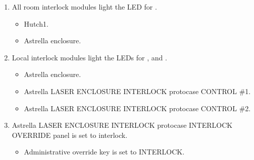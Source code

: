 \documentclass[letterpaper,10pt,english]{sphinxmanual}
\begin{document}
\begin{enumerate}
\begin{itemize}
\item {} 
\sphinxAtStartPar
Astrella enclosure outside west wall.

\item {} 
\sphinxAtStartPar
Astrella enclosure inside south wall.

\item {} 
\sphinxAtStartPar
Astrella enclosure inside west wall.

\item {} 
\sphinxAtStartPar
Astrella enclosure inside east wall.

\item {} 
\sphinxAtStartPar
Hutch\sphinxhyphen{}1 experimental chamber.

\end{itemize}

\item {} 
\sphinxAtStartPar
All room interlock modules light the LED for .
\begin{itemize}
\item {} 
\sphinxAtStartPar
Hutch\sphinxhyphen{}1.

\item {} 
\sphinxAtStartPar
Astrella enclosure.

\end{itemize}

\item {} 
\sphinxAtStartPar
Local interlock modules light the LEDs for , and .
\begin{itemize}
\item {} 
\sphinxAtStartPar
Astrella enclosure.

\item {} 
\sphinxAtStartPar
Astrella LASER ENCLOSURE INTERLOCK protocase CONTROL \#1.

\item {} 
\sphinxAtStartPar
Astrella LASER ENCLOSURE INTERLOCK protocase CONTROL \#2.

\end{itemize}

\item {} 
\sphinxAtStartPar
Astrella LASER ENCLOSURE INTERLOCK protocase INTERLOCK OVERRIDE panel is set to interlock.
\begin{itemize}
\item {} 
\sphinxAtStartPar
Administrative override key is set to INTERLOCK.


\end{itemize}
\end{enumerate}
\end{document}
